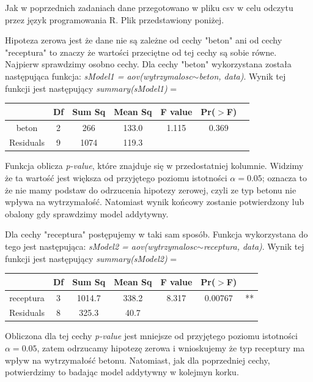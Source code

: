 \documentclass{article}
\begin{document}
Jak w poprzednich zadaniach dane przegotowano w pliku csv w celu odczytu przez język programowania R. Plik przedstawiony poniżej.
\begin{center}
\end{center}

Hipoteza zerowa jest że dane nie są zależne od cechy "beton" ani od cechy "receptura" to znaczy że wartości przeciętne od tej cechy są sobie równe. Najpierw sprawdzimy osobno cechy. Dla cechy "beton" wykorzystana została następująca funkcja: \textit{sModel1 = aov(wytrzymalosc$\sim$beton, data)}. Wynik tej funkcji jest następujący \textit{summary(sModel1)} = 
\begin{center} \begin{tabular}{|c|c|c|c|c|c|c|} \hline
& Df & Sum Sq & Mean Sq & F value & Pr($>$F) & \\ \hline
beton & 2 & 266 & 133.0 & 1.115 & 0.369 & \\ \hline
Residuals & 9 & 1074 & 119.3 & & & \\ \hline
\end{tabular} \end{center}
Funkcja oblicza \textit{p-value}, które znajduje się w przedostatniej kolumnie. Widzimy że ta wartość jest większa od przyjętego poziomu istotności $\alpha = 0.05$; oznacza to że nie mamy podstaw do odrzucenia hipotezy zerowej, czyli ze typ betonu nie wpływa na wytrzymałość. Natomiast wynik końcowy zostanie potwierdzony lub obalony gdy sprawdzimy model addytywny. \\ \par

Dla cechy "receptura" postępujemy w taki sam sposób. Funkcja wykorzystana do tego jest następująca: \textit{sModel2 = aov(wytrzymalosc$\sim$receptura, data)}. Wynik tej funkcji jest następujący \textit{summary(sModel2)} = 
\begin{center} \begin{tabular}{|c|c|c|c|c|c|c|} \hline
& Df & Sum Sq & Mean Sq & F value & Pr($>$F) & \\ \hline
receptura & 3 & 1014.7 & 338.2 & 8.317 & 0.00767 & ** \\ \hline
Residuals & 8 & 325.3 & 40.7 & & & \\ \hline
\end{tabular} \end{center}
Obliczona dla tej cechy \textit{p-value} jest mniejsze od przyjętego poziomu istotności $\alpha = 0.05$, zatem odrzucamy hipotezę zerowa i wnioskujemy że typ receptury ma wpływ na wytrzymałość betonu. Natomiast, jak dla poprzedniej cechy, potwierdzimy to badając model addytywny w kolejmyn korku. \\ \par
\end{document}
